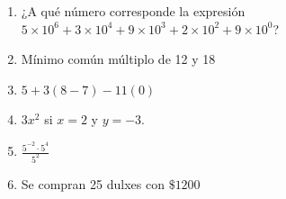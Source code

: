 \documentclass{article}
\begin{document}
\begin{enumerate}
    \item ¿A qué número corresponde la expresión \(5\times 10^6 + 3\times 10^4 + 9\times 10^3 + 2\times 10^2 + 9\times 10^0\)?
    \item Mínimo común múltiplo de 12 y 18
    \item \(5 + 3(8 - 7) - 11(0)\)
    \item \(3x^2\) si \(x = 2\) y \(y = -3\).
    \item \(\frac{5^{-2}\cdot5^4}{5^2}\)
    \item Se compran 25 dulxes con \(\mathdollar 1200\)
\end{enumerate}
\end{document}
